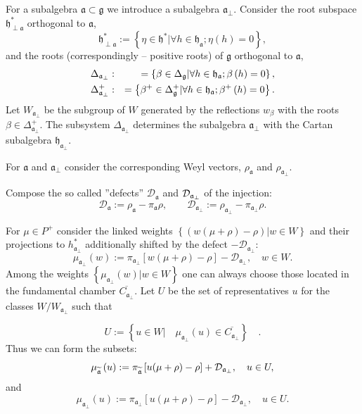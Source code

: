 \documentclass[preprint,12pt]{elsarticle}
\newcommand{\gf}{\mathfrak{g}}
\newcommand{\af}{\mathfrak{a}}
\newcommand{\afb}{\mathfrak{a}_{\bot}}
\newcommand{\hf}{\mathfrak{h}}
\begin{document}
For a subalgebra $\af\subset \gf$ we introduce a subalgebra
$\afb$. Consider the root subspace $\hf_{\perp \af}^{\ast }$
orthogonal to $\af$,
\begin{equation*}
\hf_{\perp \af}^{\ast }:=\left\{ \eta \in \hf^{\ast }|\forall
h\in \hf_{\af};\eta \left( h\right) =0\right\} ,
\end{equation*}
and the roots (correspondingly -- positive roots) of $\gf$ orthogonal
to $\af$,
\begin{eqnarray}
\Delta _{\afb} &:&=\left\{ \beta \in \Delta _{\gf}|\forall
h\in \hf_{\af};\beta \left( h\right) =0\right\} ,
\label{delta a ort} \\
\Delta _{\afb}^{+} &:&=\left\{ \beta ^{+}\in \Delta _{\gf%
}^{+}|\forall h\in \hf_{\af};\beta ^{+}\left( h\right) =0\right\} .
\notag
\end{eqnarray}
Let $W_{\afb}$ be the subgroup of $W$ generated by the
reflections $w_{\beta }$ with the roots $\beta \in \Delta _{\af_{\perp
}}^{+}$. The subsystem $\Delta _{\afb}$ determines the
subalgebra $\afb$ with the Cartan subalgebra $\hf_{\af%
_{\perp }}$.

For $\af$ and $\afb$ consider the
corresponding Weyl vectors, $\rho _{\af}$ and $\rho _{\af_{\perp
}} $.

Compose the so called ''defects'' $\mathcal{D}_{\af}$ and $\mathcal{%
D}_{\afb}$ of the injection:
\begin{equation}
\mathcal{D}_{\af}:=\rho _{\af}-\pi _{\af}\rho , \qquad
\mathcal{D}_{\afb}:=\rho _{\afb}-\pi _{\af%
_{\perp }}\rho .  \label{defect-ort}
\end{equation}

For $\mu \in P^{+}$ consider the linked weights $\left\{ \left(
w(\mu +\rho )-\rho \right) |w\in W\right\} $ and their projections
to
$h_{\afb}^{\ast }$ additionally shifted by the defect $-%
\mathcal{D}_{\afb}$:
\begin{equation*}
\mu _{\afb}\left( w\right) :=\pi _{\afb}\left[
w(\mu +\rho )-\rho \right] -\mathcal{D}_{\afb},\quad w\in W.
\end{equation*}
Among the weights $\left\{ \mu _{\af_{\perp
}}\left( w\right) |w\in W\right\} $ one can always choose those located in
the fundamental chamber $\overline{C_{\afb}}$. Let $U$ be the
set of representatives $u$ for the classes $W/W_{\afb}$ such
that

\begin{equation}
U:=\left\{ u\in W|\quad \mu _{\afb}\left( u\right) \in
\overline{C_{\afb}}\right\} \quad .  \label{U-def}
\end{equation}
Thus we can form the subsets:
\begin{equation}
\mu _{\widetilde{\mathfrak{a}}}\left( u\right) :=\pi _{\widetilde{%
\mathfrak{a}}}\left[ u(\mu +\rho )-\rho \right] +\mathcal{D}_{\af%
_{\perp }},\quad u\in U,  \label{mu-a}
\end{equation}
and
\begin{equation}
\mu _{\afb}\left( u\right) :=\pi _{\afb}\left[
u(\mu +\rho )-\rho \right] -\mathcal{D}_{\afb},\quad u\in U.
\label{mu-a-tilda}
\end{equation}
\end{document}
